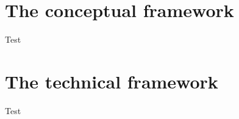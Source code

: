 \section{The conceptual framework}
\label{sec:conFrame}

Test

\newpage

\section{The technical framework}
\label{sec:techFrame}

Test

